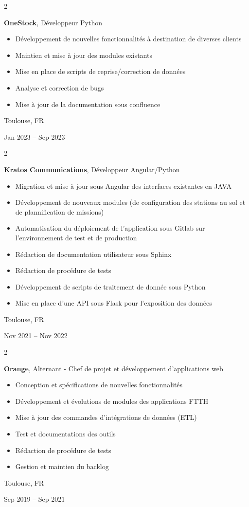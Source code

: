 \documentclass[10pt, letterpaper]{article}
\newenvironment{highlights}{
    \begin{itemize}[
        topsep=0.10 cm,
        parsep=0.10 cm,
        partopsep=0pt,
        itemsep=0pt,
        leftmargin=0.4 cm + 10pt
    ]
}{
    \end{itemize}
} %
\newenvironment{twocolentry}[2][]{
    \onecolentry
    \def\secondColumn{#2}
    \setcolumnwidth{\fill, 4.5 cm}
    \begin{paracol}{2}
}{
    \switchcolumn \raggedleft \secondColumn
    \end{paracol}
    \endonecolentry
} %
\begin{document}
\vspace{0.2 cm}

\begin{twocolentry}{
		Toulouse, FR
		
		Jan 2023 – Sep 2023
	}
	\textbf{OneStock}, Développeur Python
	\begin{highlights}
		\item Développement de nouvelles fonctionnalités à destination de diverses clients
		\item Maintien et mise à jour des modules existants
		\item Mise en place de scripts de reprise/correction de données
		\item Analyse et correction de bugs
		\item Mise à jour de la documentation sous confluence
	\end{highlights}
\end{twocolentry}

\vspace{0.2 cm}

\begin{twocolentry}{
		Toulouse, FR
		
		Nov 2021 – Nov 2022
	}
	\textbf{Kratos Communications}, Développeur Angular/Python
	\begin{highlights}
		\item Migration et mise à jour sous Angular des interfaces existantes en JAVA
		\item Développement de nouveaux modules (de configuration des stations au sol et de plannification de missions)
		\item Automatisation du déploiement de l'application sous Gitlab sur l'environnement de test et de production
		\item Rédaction de documentation utilisateur sous Sphinx
		\item Rédaction de procédure de tests
		\item Développement de scripts de traitement de donnée sous Python
		\item Mise en place d'une API sous Flask pour l'exposition des données
	\end{highlights}
\end{twocolentry}

\begin{twocolentry}{
    Toulouse, FR
    
    Sep 2019 – Sep 2021
}
\textbf{Orange}, Alternant - Chef de projet et développement d'applications web
\begin{highlights}
    \item Conception et spécifications de nouvelles fonctionnalités
    \item Développement et évolutions de modules des applications FTTH
    \item Mise à jour des commandes d'intégrations de données (ETL)
    \item Test et documentations des outils
    \item Rédaction de procédure de tests
    \item Gestion et maintien du backlog
\end{highlights}
\end{twocolentry}
\end{document}
